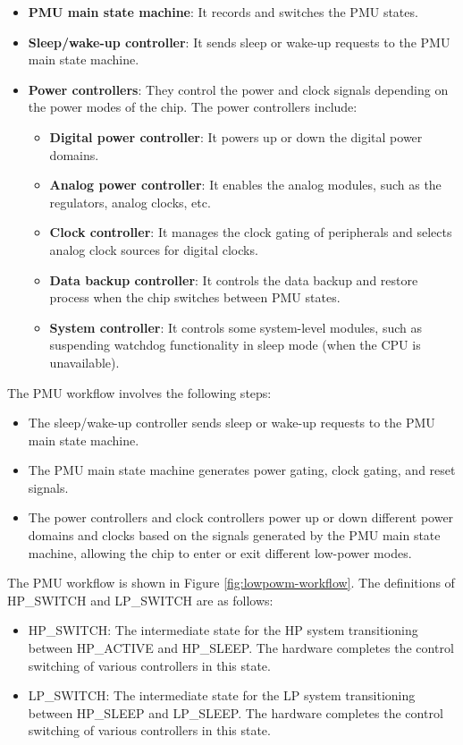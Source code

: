 \documentclass[main\_\_EN.tex]{subfiles}
\begin{document}
\begin{itemize}
\item \textbf{PMU main state machine}: It records and switches the PMU states.
\item \textbf{Sleep/wake-up controller}: It sends sleep or wake-up requests to the PMU main state machine.
\item \textbf{Power controllers}: They control the power and clock signals depending on the power modes of the chip. The power controllers include:
    \begin{itemize}
    \item \textbf{Digital power controller}: It powers up or down the digital power domains.
    \item \textbf{Analog power controller}: It enables the analog modules, such as the regulators, analog clocks, etc.
    \item \textbf{Clock controller}: It manages the clock gating of peripherals and selects analog clock sources for digital clocks.
    \item \textbf{Data backup controller}: It controls the data backup and restore process when the chip switches between PMU states.
    \item \textbf{System controller}: It controls some system-level modules, such as suspending watchdog functionality in sleep mode (when the CPU is unavailable).
    \end{itemize}
\end{itemize}

The PMU workflow involves the following steps:

\begin{itemize}
\item The sleep/wake-up controller sends sleep or wake-up requests to the PMU main state machine.
\item The PMU main state machine generates power gating, clock gating, and reset signals.
\item The power controllers and clock controllers power up or down different power domains and clocks based on the signals generated by the PMU main state machine, allowing the chip to enter or exit different low-power modes.
\end{itemize}

The PMU workflow is shown in Figure \ref{fig:lowpowm-workflow}. The definitions of HP\_SWITCH and LP\_SWITCH are as follows:

\begin{itemize}
    \item HP\_SWITCH: The intermediate state for the HP system transitioning between HP\_ACTIVE and HP\_SLEEP. The hardware completes the control switching of various controllers in this state.
    \item LP\_SWITCH: The intermediate state for the LP system transitioning between HP\_SLEEP and LP\_SLEEP. The hardware completes the control switching of various controllers in this state.
\end{itemize}
\end{document}
